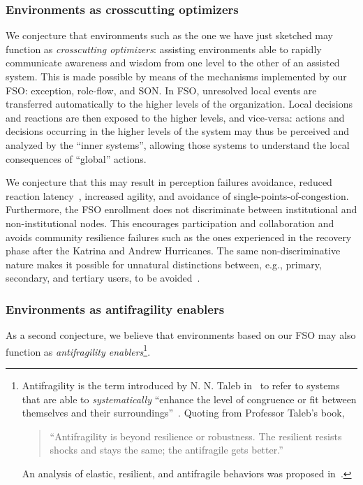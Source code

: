 \documentclass[twocolumn]{svjour3}
\begin{document}
\subsubsection{Environments as crosscutting optimizers}
We conjecture that environments such as the one
we have just sketched may function as \emph{crosscutting optimizers}: assisting environments
able to rapidly communicate awareness and wisdom from one level to the other of an
assisted system.
This is made possible by means of the mechanisms implemented by our FSO: exception, role-flow, and SON.
In FSO, unresolved local events are transferred automatically to the higher levels of the organization.
Local decisions and reactions are then exposed to the higher levels, and vice-versa: actions and decisions
occurring in the higher levels of the system may thus be perceived and analyzed by the ``inner systems'',
allowing those systems to understand the local consequences of ``global'' actions.

We conjecture that this may result in perception failures avoidance, reduced reaction
latency~\cite{Miskel08,Adair02}, increased agility, and avoidance of single-points-of-congestion.
Furthermore, the FSO enrollment does not discriminate between institutional and non-institutional nodes.
This encourages participation and collaboration and avoids community resilience failures
such as the ones experienced in the recovery phase after the Katrina and
Andrew Hurricanes.
The same non-discriminative nature makes it possible for
unnatural distinctions between, e.g., primary, secondary, and tertiary users, to be avoided~\cite{SDGB07a}.

\subsubsection{Environments as antifragility enablers}
As a second conjecture, we believe that environments based on our FSO may also function
as \emph{antifragility enablers}\footnote{Antifragility is the term
	introduced by N. N. Taleb in~\cite{Taleb12} to refer to systems that are
	able to \emph{systematically\/}
	``enhance the level of congruence or fit between themselves
	and their surroundings''~\cite{stokols2013enhancing}. Quoting from Professor Taleb's book,
	\begin{quote}
	``Antifragility is beyond resilience or robustness. The resilient resists shocks
	and stays the same; the antifragile gets better.''
	\end{quote}
	An analysis of elastic, resilient, and antifragile behaviors was proposed in~\cite{DF15b}.}.
\end{document}
